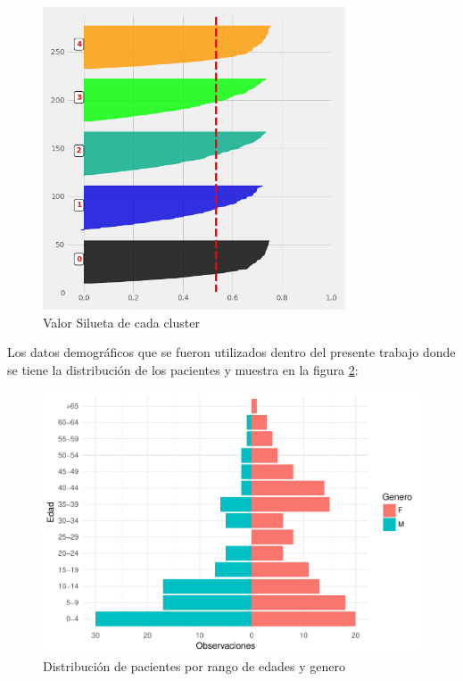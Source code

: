 \begin{figure}[H] 
	\centering
	\includegraphics[width=0.8\textwidth]{Kap4/S}
	\caption{Valor Silueta de cada cluster} 
	\label{fig:S}
\end{figure}

Los datos demográficos que se fueron utilizados dentro del presente trabajo donde se tiene la distribución de los pacientes y  muestra en la figura \ref{fig:demografia}:   

\begin{figure}[H]
	\centering
	\includegraphics[width=1\textwidth]{Kap4/general.pdf}
	\caption{Distribución de pacientes por rango de edades y genero} \label{fig:demografia}
\end{figure} 

